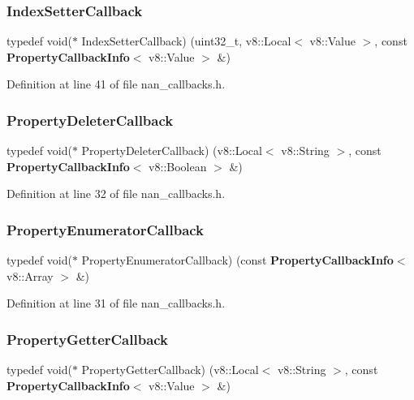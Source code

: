 \subsubsection{Index\+Setter\+Callback}
{\footnotesize\ttfamily typedef void($\ast$ Index\+Setter\+Callback) (uint32\+\_\+t, v8\+::\+Local$<$ v8\+::\+Value $>$, const \textbf{ Property\+Callback\+Info}$<$ v8\+::\+Value $>$ \&)}



Definition at line 41 of file nan\+\_\+callbacks.\+h.

\mbox{\label{nan__callbacks_8h_a956d573636aae9243078093a6dd1fbd0}} 
\subsubsection{Property\+Deleter\+Callback}
{\footnotesize\ttfamily typedef void($\ast$ Property\+Deleter\+Callback) (v8\+::\+Local$<$ v8\+::\+String $>$, const \textbf{ Property\+Callback\+Info}$<$ v8\+::\+Boolean $>$ \&)}



Definition at line 32 of file nan\+\_\+callbacks.\+h.

\mbox{\label{nan__callbacks_8h_afb49cbe6047c500993ea6d9d65fa30ef}} 
\subsubsection{Property\+Enumerator\+Callback}
{\footnotesize\ttfamily typedef void($\ast$ Property\+Enumerator\+Callback) (const \textbf{ Property\+Callback\+Info}$<$ v8\+::\+Array $>$ \&)}



Definition at line 31 of file nan\+\_\+callbacks.\+h.

\mbox{\label{nan__callbacks_8h_acd92e0404dadebfe37dd6ce47b8d2ade}} 
\subsubsection{Property\+Getter\+Callback}
{\footnotesize\ttfamily typedef void($\ast$ Property\+Getter\+Callback) (v8\+::\+Local$<$ v8\+::\+String $>$, const \textbf{ Property\+Callback\+Info}$<$ v8\+::\+Value $>$ \&)}



